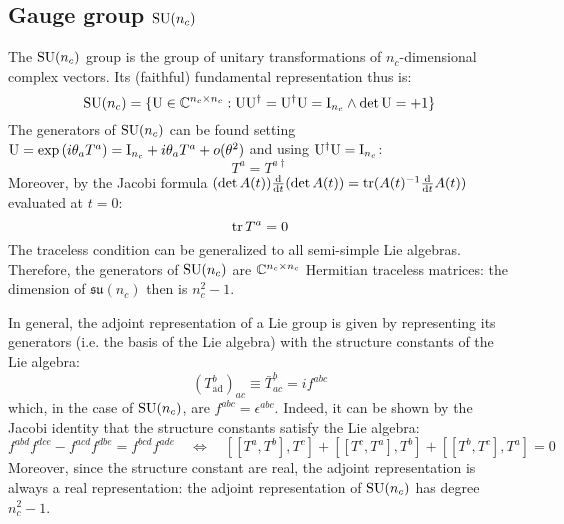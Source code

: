 \subsection{Gauge group \texorpdfstring{$ \mathrm{SU}(n_c) $}{SU(n)}}

The $ \mathrm{SU}(n_c) $ group is the group of unitary transformations of $ n_c $-dimensional complex vectors. Its (faithful) fundamental representation thus is:
\begin{equation*}
  \mathrm{SU}(n_c) = \{\mathrm{U} \in \mathbb{C}^{n_c \times n_c} : \mathrm{U}\mathrm{U}^\dagger = \mathrm{U}^\dagger\mathrm{U} = \mathrm{I}_{n_c} \land \det{\mathrm{U}} = +1 \}
\end{equation*}
The generators of $ \mathrm{SU}(n_c) $ can be found setting $ \mathrm{U} = \exp \left( i \theta_a T^a \right) = \mathrm{I}_{n_c} + i \theta_a T^a + o(\theta^2) $ and using $ \mathrm{U}^\dagger\mathrm{U} = \mathrm{I}_{n_c} $:
\begin{equation}
  T^a = T^{a\dagger}
  \label{eq:sun-herm}
\end{equation}
Moreover, by the Jacobi formula $ (\det A(t)) \frac{\mathrm{d}}{\mathrm{d} t} (\det A(t)) = \operatorname{tr} (A(t)^{-1} \frac{\mathrm{d}}{\mathrm{d} t} A(t)) $ evaluated at $ t = 0 $:
\begin{equation}
  \operatorname{tr} T^a = 0
  \label{eq:sun-trace}
\end{equation}
The traceless condition can be generalized to all semi-simple Lie algebras.
Therefore, the generators of $ \mathrm{SU}(n_c) $ are $ \mathbb{C}^{n_c \times n_c} $ Hermitian traceless matrices: the dimension of $ \mathfrak{su}(n_c) $ then is $ n_c^2 - 1 $.

In general, the adjoint representation of a Lie group is given by representing its generators (i.e. the basis of the Lie algebra) with the structure constants of the Lie algebra:
\begin{equation}
  (T^b_\text{ad})_{ac} \equiv \bar{T}^b_{ac} = i f^{abc}
\end{equation}
which, in the case of $ \mathrm{SU}(n_c) $, are $ f^{abc} = \epsilon^{abc} $. Indeed, it can be shown by the Jacobi identity that the structure constants satisfy the Lie algebra:
\begin{equation*}
  f^{abd} f^{dce} - f^{acd} f^{dbe} = f^{bcd} f^{ade}
  \quad \iff \quad
  [[T^a,T^b],T^c] + [[T^c,T^a],T^b] + [[T^b,T^c],T^a] = 0
\end{equation*}
Moreover, since the structure constant are real, the adjoint representation is always a real representation: the adjoint representation of $ \mathrm{SU}(n_c) $ has degree $ n_c^2 - 1 $.

